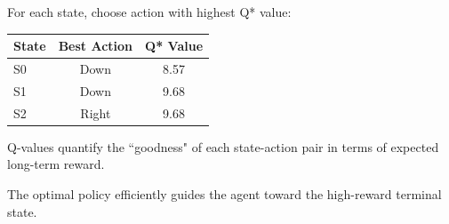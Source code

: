 \documentclass[aspectratio=169,xcolor=dvipsnames,svgnames,x11names,fleqn]{beamer}
\begin{document}
\begin{frame}{}
    \footnotesize
    \begin{tcolorbox}[colback=lightgreen!30,colframe=indianRed!60!black,title=Optimal Policy $\pi^*$]
        For each state, choose action with highest Q* value:
        \begin{center}
            \begin{tabular}{lcc}
                \toprule
                \textbf{State} & \textbf{Best Action} & \textbf{Q* Value} \\
                \midrule
                \rowcolor{lightorange!20} S0 & Down & 8.57 \\
                \rowcolor{lightorange!20} S1 & Down & 9.68 \\
                \rowcolor{lightorange!20} S2 & Right & 9.68 \\
                \bottomrule
            \end{tabular}
        \end{center}
    \end{tcolorbox}
    
    \begin{tblock}{}
        Q-values quantify the ``goodness" of each state-action pair in terms of expected long-term reward.
    \end{tblock}
    
    \vspace{0.3cm}
    \begin{center}
        The optimal policy efficiently guides the agent toward the high-reward terminal state.
    \end{center}
\end{frame}
\end{document}
